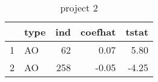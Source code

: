 \begin{table}
\centering
\caption{project 2}
\begin{tabular}{rlrrr}
  \hline
 & type & ind & coefhat & tstat \\ 
  \hline
1 & AO &  62 & 0.07 & 5.80 \\ 
  2 & AO & 258 & -0.05 & -4.25 \\ 
   \hline
\end{tabular}
\end{table}